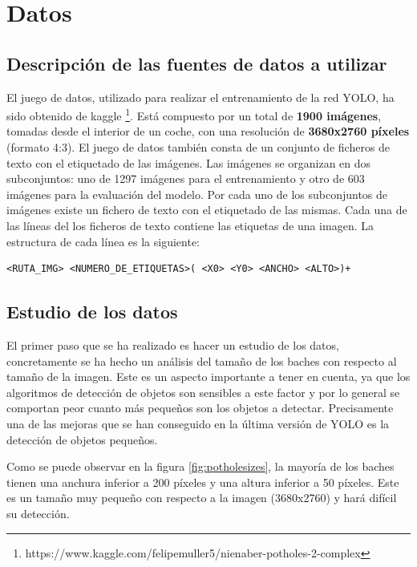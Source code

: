 \section{Datos}
\label{sec:datos}

\subsection{Descripción de las fuentes de datos a utilizar}

El juego de datos, utilizado para realizar el entrenamiento de la red YOLO, ha sido obtenido de kaggle \footnote{https://www.kaggle.com/felipemuller5/nienaber-potholes-2-complex}. Está compuesto por un total de \textbf{1900 imágenes}, tomadas desde el interior de un coche, con una resolución de \textbf{3680x2760 píxeles} (formato 4:3). El juego de datos también consta de un conjunto de ficheros de texto con el etiquetado de las imágenes. Las imágenes se organizan en dos subconjuntos: uno de 1297 imágenes para el entrenamiento y otro de 603 imágenes para la evaluación del modelo. Por cada uno de los subconjuntos de imágenes existe un fichero de texto con el etiquetado de las mismas. Cada una de las líneas del los ficheros de texto contiene las etiquetas de una imagen. La estructura de cada línea es la siguiente:

\begin{lstlisting}[frame=single,basicstyle=\ttfamily\footnotesize]
<RUTA_IMG> <NUMERO_DE_ETIQUETAS>( <X0> <Y0> <ANCHO> <ALTO>)+
\end{lstlisting}

\subsection{Estudio de los datos}

El primer paso que se ha realizado es hacer un estudio de los datos, concretamente se ha hecho un análisis del tamaño de los baches con respecto al tamaño de la imagen. Este es un aspecto importante a tener en cuenta, ya que los algoritmos de detección de objetos son sensibles a este factor y por lo general se comportan peor cuanto más pequeños son los objetos a detectar. Precisamente una de las mejoras que se han conseguido en la última versión de YOLO es la detección de objetos pequeños.

Como se puede observar en la figura \ref{fig:potholesizes}, la mayoría de los baches tienen una anchura inferior a 200 píxeles y una altura inferior a 50 píxeles. Este es un tamaño muy pequeño con respecto a la imagen (3680x2760) y hará difícil su detección.

